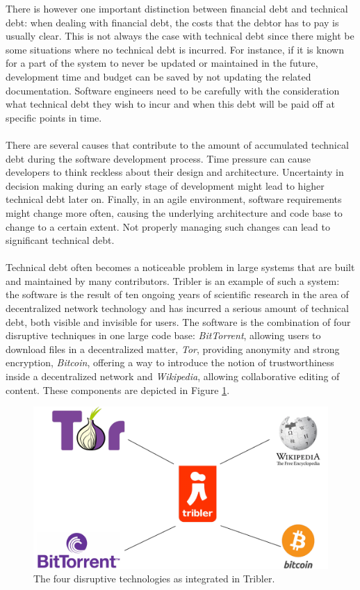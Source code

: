There is however one important distinction between financial debt and technical debt: when dealing with financial debt, the costs that the debtor has to pay is usually clear.
This is not always the case with technical debt since there might be some situations where no technical debt is incurred.
For instance, if it is known for a part of the system to never be updated or maintained in the future, development time and budget can be saved by not updating the related documentation.
Software engineers need to be carefully with the consideration what technical debt they wish to incur and when this debt will be paid off at specific points in time.\\\\
There are several causes that contribute to the amount of accumulated technical debt during the software development process\cite{martini2014architecture}. Time pressure can cause developers to think reckless about their design and architecture. Uncertainty in decision making during an early stage of development might lead to higher technical debt later on. Finally, in an agile environment, software requirements might change more often, causing the underlying architecture and code base to change to a certain extent. Not properly managing such changes can lead to significant technical debt.\\\\
Technical debt often becomes a noticeable problem in large systems that are built and maintained by many contributors. Tribler is an example of such a system: the software is the result of ten ongoing years of scientific research in the area of decentralized network technology and has incurred a serious amount of technical debt, both visible and invisible for users.
The software is the combination of four disruptive techniques in one large code base: \emph{BitTorrent}, allowing users to download files in a decentralized matter, \emph{Tor}, providing anonymity and strong encryption, \emph{Bitcoin}, offering a way to introduce the notion of trustworthiness inside a decentralized network and \emph{Wikipedia}, allowing collaborative editing of content. These components are depicted in Figure \ref{fig:tribler-connections}.\\

\begin{figure}[h!]
	\centering
	\includegraphics[width=0.6\columnwidth]{images/introduction/tribler_connections}
	\caption{The four disruptive technologies as integrated in Tribler.}
	\label{fig:tribler-connections}
\end{figure}

